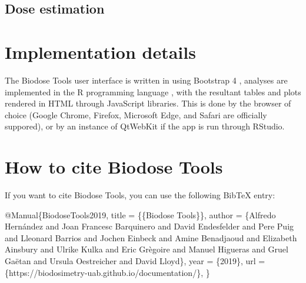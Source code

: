 \documentclass[]{scrartcl}
\newenvironment{Shaded}{\begin{snugshade}}{\end{snugshade}}
\newcommand{\NormalTok}[1]{#1}
\begin{document}
\hypertarget{dose-estimation-1}{%
\subsection{Dose estimation}\label{dose-estimation-1}}

\hypertarget{refs}{}

\hypertarget{appendix-appendices}{%
\appendix}


\hypertarget{app:implementation}{%
\section{Implementation details}\label{app:implementation}}

The Biodose Tools user interface is written in \citep{R-shiny} using Bootstrap 4 \citep{R-bs4Dash}, analyses are implemented in the R programming language \citep{R-base}, with the resultant tables and plots rendered in HTML through JavaScript libraries. This is done by the browser of choice (Google Chrome, Firefox, Microsoft Edge, and Safari are officially suppored), or by an instance of QtWebKit if the app is run through RStudio.

\hypertarget{how-to-cite-biodose-tools}{%
\section{How to cite Biodose Tools}\label{how-to-cite-biodose-tools}}

If you want to cite Biodose Tools, you can use the following BibTeX entry:

\begin{Shaded}
\begin{Highlighting}[]
\NormalTok{@Manual\{BiodoseTools2019,}
\NormalTok{  title = \{\{Biodose Tools\}\},}
\NormalTok{  author = \{Alfredo Hernández and Joan Francesc Barquinero and David Endesfelder and Pere Puig and Lleonard Barrios and Jochen Einbeck and Amine Benadjaoud and Elizabeth Ainsbury and Ulrike Kulka and Eric Grègoire and Manuel Higueras and Gruel Gaëtan and Ursula Oestreicher and David Lloyd\},}
\NormalTok{  year = \{2019\},}
\NormalTok{  url = \{https://biodosimetry-uab.github.io/documentation/\},}
\NormalTok{\}}
\end{Highlighting}
\end{Shaded}


\end{document}
